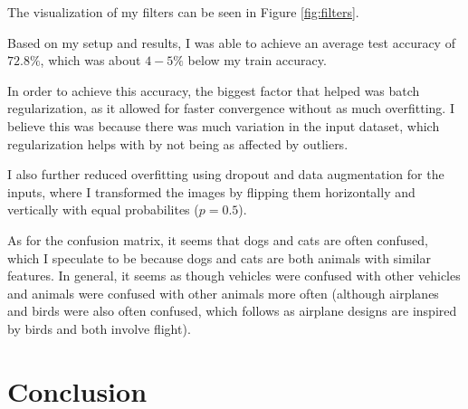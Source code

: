 \documentclass{article}
\newcommand{\testaccuracy}{72.8}
\begin{document}
The visualization of my filters can be seen in Figure \ref{fig:filters}.

Based on my setup and results, I was able to achieve an average test accuracy of $\testaccuracy\%$, which was about $4-5\%$ below my train accuracy.

In order to achieve this accuracy, the biggest factor that helped was batch regularization, as it allowed for faster convergence without as much overfitting. I believe this was because there was much variation in the input dataset, which regularization helps with by not being as affected by outliers.

I also further reduced overfitting using dropout and data augmentation for the inputs, where I transformed the images by flipping them horizontally and vertically with equal probabilites ($p=0.5$).

As for the confusion matrix, it seems that dogs and cats are often confused, which I speculate to be because dogs and cats are both animals with similar features. In general, it seems as though vehicles were confused with other vehicles and animals were confused with other animals more often (although airplanes and birds were also often confused, which follows as airplane designs are inspired by birds and both involve flight).

\section{Conclusion}
\end{document}
